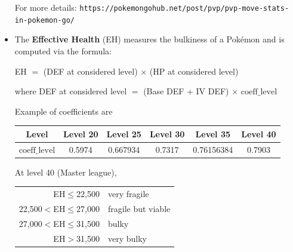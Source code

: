 \documentclass[8pt,aspectratio=169,compress]{beamer}
\begin{document}
\begin{frame}
\begin{block}{}
\begin{tiny}
\begin{itemize}
 For more details: \texttt{https://pokemongohub.net/post/pvp/pvp-move-stats-in-pokemon-go/}
 
 \item The \textbf{Effective Health} (EH) measures the bulkiness of a Pok\'emon and is computed via the formula:
\begin{center}
EH $=$ (DEF at considered level) $\times$ (HP at considered level)
\end{center}

where DEF at considered level $=$ (Base DEF + IV DEF) $\times$ $\text{coeff}\_\text{level}$

Example of coefficients are

\begin{center}
\begin{tabular}{cccccc} 
Level &   Level 20 &  Level 25 &  Level 30 &  Level 35 &  Level 40 \\ \hline
$\text{coeff}\_\text{level}$ &   0.5974 & 0.667934 & 0.7317 & 0.76156384 & 0.7903 \\
\end{tabular}   
\end{center}

At level 40 (Master league),

\begin{center}
\begin{tabular}{rl}
EH$\leq$22,500  & very fragile \\
22,500$<$EH$\leq$27,000  & fragile but viable \\
27,000$<$EH$\leq$31,500  & bulky \\
EH$>$31,500  & very bulky \\
\end{tabular}
\end{center}

\end{itemize}
\end{tiny}
\end{block}
\end{frame}
\end{document}
